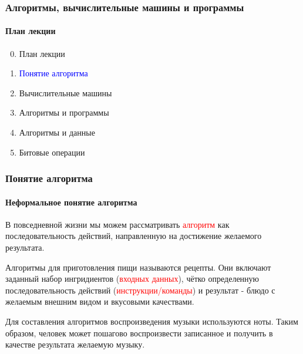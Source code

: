 \documentclass[aspectratio=169]{beamer}
\begin{document}
\begin{frame}
\frametitle{Алгоритмы, вычислительные машины и программы}
\framesubtitle{План лекции}

\begin{enumerate}
  \setcounter{enumi}{-1}
  \item{План лекции}
  \item{\textcolor{blue}{Понятие алгоритма}}
  \item{Вычислительные машины}
  \item{Алгоритмы и программы}
  \item{Алгоритмы и данные}
  \item{Битовые операции}

\end{enumerate}
\end{frame}

\begin{frame}
\frametitle{Понятие алгоритма}
\framesubtitle{Неформальное понятие алгоритма}
\justifying
В повседневной жизни мы можем рассматривать \textcolor{red}{алгоритм} как последовательность действий, направленную на достижение желаемого результата.\newline

Алгоритмы для приготовления пищи называются рецепты.
Они включают заданный набор ингридиентов (\textcolor{red}{входных данных}), чётко определенную последовательность действий (\textcolor{red}{инструкции/команды}) и результат - блюдо с желаемым внешним видом и вкусовыми качествами.\newline

Для составления алгоритмов воспроизведения музыки используются ноты. Таким образом, человек может пошагово воспроизвести записанное и получить в качестве результата желаемую музыку.

\end{frame}
\end{document}
